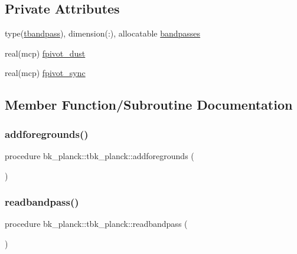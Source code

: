 \subsection*{Private Attributes}
\begin{DoxyCompactItemize}
\item 
type(\mbox{\hyperlink{structbk__planck_1_1tbandpass}{tbandpass}}), dimension(\+:), allocatable \mbox{\hyperlink{structbk__planck_1_1tbk__planck_a6e907802040de8e969824489801154fe}{bandpasses}}
\item 
real(mcp) \mbox{\hyperlink{structbk__planck_1_1tbk__planck_a10242b811afbfd859b3c32205534b776}{fpivot\+\_\+dust}}
\item 
real(mcp) \mbox{\hyperlink{structbk__planck_1_1tbk__planck_a55f8ea8aa72e41f98b69a51495554454}{fpivot\+\_\+sync}}
\end{DoxyCompactItemize}


\subsection{Member Function/\+Subroutine Documentation}
\mbox{\label{structbk__planck_1_1tbk__planck_ae2798374030523fb23a4c7eb6f094f3f}} 
\subsubsection{\texorpdfstring{addforegrounds()}{addforegrounds()}}
{\footnotesize\ttfamily procedure bk\+\_\+planck\+::tbk\+\_\+planck\+::addforegrounds (\begin{DoxyParamCaption}{ }\end{DoxyParamCaption})\hspace{0.3cm}{\ttfamily [private]}}

\mbox{\label{structbk__planck_1_1tbk__planck_a96c8beebcea587a7c8a5a5205f946347}} 
\subsubsection{\texorpdfstring{readbandpass()}{readbandpass()}}
{\footnotesize\ttfamily procedure bk\+\_\+planck\+::tbk\+\_\+planck\+::readbandpass (\begin{DoxyParamCaption}{ }\end{DoxyParamCaption})\hspace{0.3cm}{\ttfamily [private]}}

